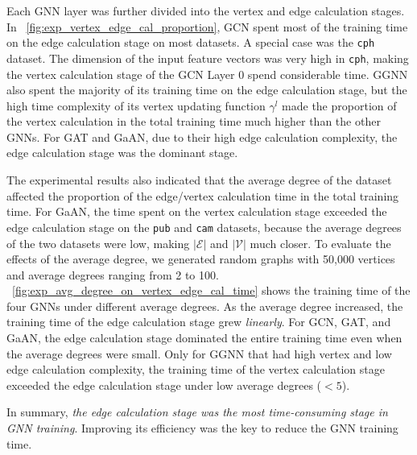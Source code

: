 Each GNN layer was further divided into the vertex and edge calculation stages.
%
In \figurename~\ref{fig:exp_vertex_edge_cal_proportion}, GCN spent most of the training time on the edge calculation stage on most datasets.
%
A special case was the \texttt{cph} dataset.
%
The dimension of the input feature vectors was very high in \texttt{cph}, making the vertex calculation stage of the GCN Layer 0 spend considerable time.
%
GGNN also spent the majority of its training time on the edge calculation stage, but the high time complexity of its vertex updating function $\gamma^l$ made the proportion of the vertex calculation in the total training time much higher than the other GNNs.
%
For GAT and GaAN, due to their high edge calculation complexity, the edge calculation stage was the dominant stage.

The experimental results also indicated that the average degree of the dataset affected the proportion of the edge/vertex calculation time in the total training time.
%
For GaAN, the time spent on the vertex calculation stage exceeded the edge calculation stage on the \texttt{pub} and \texttt{cam} datasets, because the average degrees of the two datasets were low, making $|\mathcal{E}|$ and $|\mathcal{V}|$ much closer.
%
To evaluate the effects of the average degree, we generated random graphs with 50,000 vertices and average degrees ranging from 2 to 100.
%
\figurename~\ref{fig:exp_avg_degree_on_vertex_edge_cal_time} shows the training time of the four GNNs under different average degrees.
%
As the average degree increased, the training time of the edge calculation stage grew \emph{linearly}.
%
For GCN, GAT, and GaAN, the edge calculation stage dominated the entire training time even when the average degrees were small.
%
Only for GGNN that had high vertex and low edge calculation complexity, the training time of the vertex calculation stage exceeded the edge calculation stage under low average degrees ($<5$).

In summary, \emph{the edge calculation stage was the most time-consuming stage in GNN training}.
%
Improving its efficiency was the key to reduce the GNN training time.


